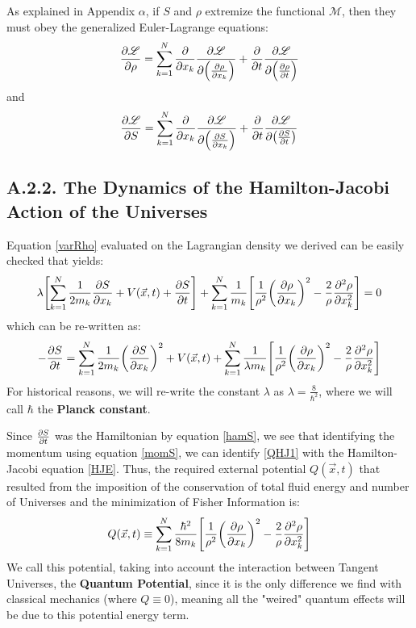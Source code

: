 \documentclass[11pt, a4paper]{article} %
\newcommand{\M}{\mathcal{M}}
\newcommand{\Lg}{\mathscr{L}}
\begin{document}
As explained in Appendix $\alpha$, if $S$ and $\rho$ extremize the functional $\M$, then they must obey the generalized Euler-Lagrange equations:
\begin{equation}\label{varRho}
\pdv{\Lg}{\rho}=\sum_{k=1}^N \pdv{}{x_k}\pdv{\Lg}{\qty(\pdv{\rho}{x_k})}+\pdv{}{t}\pdv{\Lg}{\qty(\pdv{\rho}{t})}
\end{equation}
and
\begin{equation}\label{varS}
\pdv{\Lg}{S}=\sum_{k=1}^N \pdv{}{x_k}\pdv{\Lg}{\qty(\pdv{S}{x_k})}+\pdv{}{t}\pdv{\Lg}{\qty(\pdv{S}{t})}
\end{equation}


\subsection*{A.2.2. The Dynamics of the Hamilton-Jacobi Action of the Universes}

Equation \eqref{varRho} evaluated on the Lagrangian density we derived can be easily checked that yields:
\begin{equation}
\lambda \qty[ \sum_{k=1}^N \frac{1}{2m_k} \pdv{S}{x_k}+V(\vec{x},t)+\pdv{S}{t} ] +\sum_{k=1}^N \frac{1}{m_k}\qty[\frac{1}{\rho^2}\qty(\pdv{\rho}{x_k})^2 -\frac{2}{\rho}\pdv[2]{\rho}{x_k}]=0
\end{equation}
which can be re-written as:
\begin{equation}\label{QHJ1}
-\pdv{S}{t} = \sum_{k=1}^N \frac{1}{2m_k} \qty(\pdv{S}{x_k})^2+V(\vec{x},t)+\sum_{k=1}^N \frac{1}{\lambda m_k}\qty[\frac{1}{\rho^2}\qty(\pdv{\rho}{x_k})^2 -\frac{2}{\rho}\pdv[2]{\rho}{x_k}]
\end{equation}
For historical reasons, we will re-write the constant $\lambda$ as $\lambda=\frac{8}{\hbar^2}$, where we will call $\hbar$ the {\bf Planck constant}.

Since $\pdv{S}{t}$ was the Hamiltonian by equation \eqref{hamS}, we see that identifying the momentum using equation \eqref{momS}, we can identify \eqref{QHJ1} with the Hamilton-Jacobi equation \eqref{HJE}. Thus, the required external potential $Q(\vec{x},t)$ that resulted from the imposition of the conservation of total fluid energy and number of Universes and the minimization of Fisher Information is:
\begin{equation}
Q(\vec{x},t)\equiv \sum_{k=1}^N \frac{\hbar^2}{8 m_k}\qty[\frac{1}{\rho^2}\qty(\pdv{\rho}{x_k})^2 -\frac{2}{\rho}\pdv[2]{\rho}{x_k}]
\end{equation}
We call this potential, taking into account the interaction between Tangent Universes, the {\bf Quantum Potential}, since it is the only difference we find with classical mechanics (where $Q\equiv 0$), meaning all the "weired" quantum effects will be due to this potential energy term.
\end{document}
